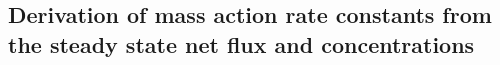 \subsection{Derivation of mass action rate constants   from the steady state net flux and concentrations}          